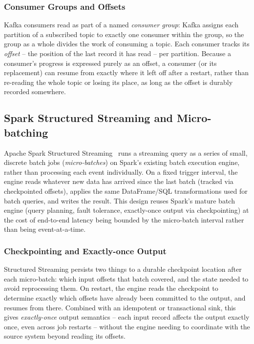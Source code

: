 \subsubsection{Consumer Groups and Offsets}

Kafka consumers read as part of a named \emph{consumer group}: Kafka assigns each partition of a subscribed topic to exactly one consumer within the group, so the group as a whole divides the work of consuming a topic. Each consumer tracks its \emph{offset} -- the position of the last record it has read -- per partition. Because a consumer's progress is expressed purely as an offset, a consumer (or its replacement) can resume from exactly where it left off after a restart, rather than re-reading the whole topic or losing its place, as long as the offset is durably recorded somewhere.

\subsection{Spark Structured Streaming and Micro-batching}

Apache Spark Structured Streaming~\cite{spark-structured-streaming} runs a streaming query as a series of small, discrete batch jobs (\emph{micro-batches}) on Spark's existing batch execution engine, rather than processing each event individually. On a fixed trigger interval, the engine reads whatever new data has arrived since the last batch (tracked via checkpointed offsets), applies the same DataFrame/SQL transformations used for batch queries, and writes the result. This design reuses Spark's mature batch engine (query planning, fault tolerance, exactly-once output via checkpointing) at the cost of end-to-end latency being bounded by the micro-batch interval rather than being event-at-a-time.

\subsubsection{Checkpointing and Exactly-once Output}

Structured Streaming persists two things to a durable checkpoint location after each micro-batch: which input offsets that batch covered, and the state needed to avoid reprocessing them. On restart, the engine reads the checkpoint to determine exactly which offsets have already been committed to the output, and resumes from there. Combined with an idempotent or transactional sink, this gives \emph{exactly-once} output semantics -- each input record affects the output exactly once, even across job restarts -- without the engine needing to coordinate with the source system beyond reading its offsets.

